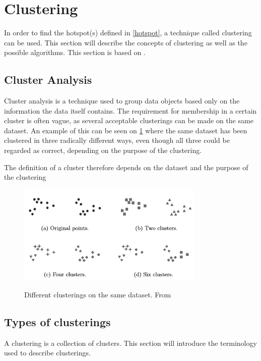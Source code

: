 \section{Clustering}\label{clustering}
In order to find the hotspot(s) defined in \cref{hotspot}, a technique called clustering can be used.
This section will describe the concepts of clustering as well as the possible algorithms.
This section is based on \citet{pang2006introduction}. 

\subsection{Cluster Analysis}
Cluster analysis is a technique used to group data objects based only on the information the data itself contains.
The requirement for membership in a certain cluster is often vague, as several acceptable clusterings can be made on the same dataset.
An example of this can be seen on \cref{clusterings} where the same dataset has been clustered in three radically different ways, even though all three could be regarded as correct, depending on the purpose of the clustering.

The definition of a cluster therefore depends on the dataset and the purpose of the clustering 

\begin{figure}[H]
\includegraphics[width=0.8\textwidth]{graphics/clusterings}
\centering
\label{clusterings}
\caption{Different clusterings on the same dataset. From \citet{pang2006introduction}}
\end{figure}

\subsection{Types of clusterings}

A clustering is a collection of clusters.
This section will introduce the terminology used to describe clusterings. 


